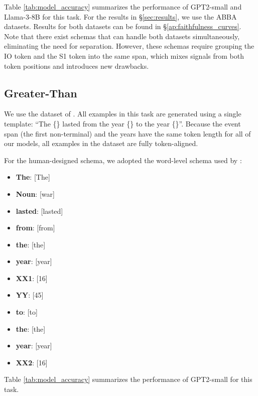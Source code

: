 Table \ref{tab:model_accuracy} summarizes the performance of GPT2-small and Llama-3-8B for this task.
For the results in \S\ref{sec:results}, we use the ABBA datasets. Results for both datasets can be found in \S\ref{ap:faithfulness_curves}.
Note that there exist schemas that can handle both datasets simultaneously, eliminating the need for separation. However, these schemas require grouping the IO token and the S1 token into the same span, which mixes signals from both token positions and introduces new drawbacks.

\subsection{Greater-Than}\label{ap:task_details_gt}
We use the dataset of \citet{hanna2024does}. All examples in this task are generated using a single template:
``The \{\} lasted from the year \{\} to the year \{\}''. Because the event span (the first non-terminal) and the years have the same token length for all of our models, all examples in the dataset are fully token-aligned.

For the human-designed schema, we adopted the word-level schema used by \citet{hanna2024does}: \begin{itemize}[itemsep=0pt, topsep=0pt]
    \item \textbf{The}: [The]
    \item \textbf{Noun}: [war]
    \item \textbf{lasted}: [lasted]
    \item \textbf{from}: [from]
    \item \textbf{the}: [the]
    \item \textbf{year}: [year]
    \item \textbf{XX1}: [16]
    \item \textbf{YY}: [45]
    \item \textbf{to}: [to]
    \item \textbf{the}: [the]
    \item \textbf{year}: [year]
    \item \textbf{XX2}: [16]
\end{itemize}



Table \ref{tab:model_accuracy} summarizes the performance of GPT2-small for this task.

